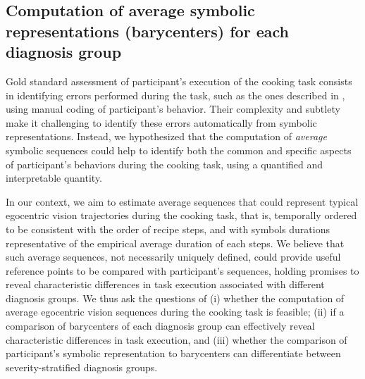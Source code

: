 \begin{chapterabstract}
        

\section{Computation of average symbolic representations (barycenters) for each diagnosis group}
 \label{sec:chapter_6_barycenter_computation}   

    Gold standard assessment of participant’s execution of the cooking task consists in identifying errors performed during the task, such as the ones described in , using manual coding of participant's behavior. Their complexity and subtlety make it challenging to identify these errors automatically from symbolic representations. Instead, we hypothesized that the computation of \textit{average} symbolic sequences could help to identify both the common and specific aspects of participant's behaviors during the cooking task, using a quantified and interpretable quantity. 

    In our context, we aim to estimate average sequences that could represent typical egocentric vision trajectories during the cooking task, that is, temporally ordered to be consistent with the order of recipe steps, and with symbols durations representative of the empirical average duration of each steps. We believe that such average sequences, not necessarily uniquely defined, could provide useful reference points to be compared with participant's sequences, holding promises to reveal characteristic differences in task execution associated with different diagnosis groups. 
    We thus ask the questions of (i) whether the computation of average egocentric vision sequences during the cooking task is feasible; (ii) if a comparison of barycenters of each diagnosis group can effectively reveal characteristic differences in task execution, and (iii) whether the comparison of participant's symbolic representation to barycenters can differentiate between severity-stratified diagnosis groups.
    



\end{chapterabstract}
